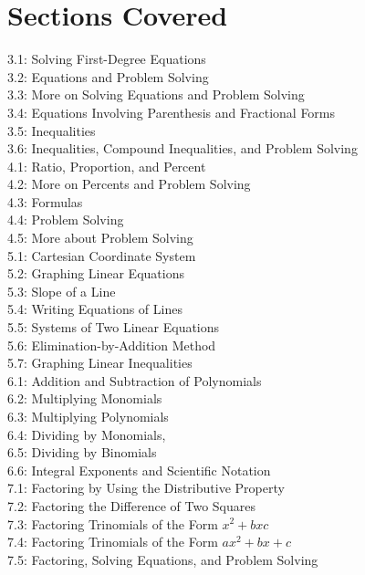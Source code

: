 \documentclass[11pt]{article}
\begin{document}
\newpage
\footnotesize{
\section*{Sections Covered}
3.1: Solving First-Degree Equations \\
3.2: Equations and Problem Solving \\
3.3: More on Solving Equations and Problem Solving \\
3.4: Equations Involving Parenthesis and Fractional Forms \\
3.5: Inequalities \\
3.6: Inequalities, Compound Inequalities, and Problem Solving \\
4.1: Ratio, Proportion, and Percent \\
4.2: More on Percents and Problem Solving \\
4.3: Formulas \\
4.4: Problem Solving \\
4.5: More about Problem Solving \\
5.1: Cartesian Coordinate System \\
5.2: Graphing Linear Equations \\
5.3: Slope of a Line \\
5.4: Writing Equations of Lines \\
5.5: Systems of Two Linear Equations \\
5.6: Elimination-by-Addition Method \\
5.7: Graphing Linear Inequalities \\
6.1: Addition and Subtraction of Polynomials \\
6.2: Multiplying Monomials \\
6.3: Multiplying Polynomials \\
6.4: Dividing by Monomials, \\
6.5: Dividing by Binomials \\
6.6: Integral Exponents and Scientific Notation \\
7.1: Factoring by Using the Distributive Property \\
7.2: Factoring the Difference of Two Squares \\
7.3: Factoring Trinomials of the Form $x^2 + bxc$ \\
7.4: Factoring Trinomials of the Form $ax^2 + bx + c$ \\
7.5: Factoring, Solving Equations, and Problem Solving \\
}
\end{document}
